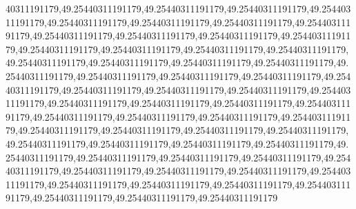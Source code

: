 40311191179,49.25440311191179,49.25440311191179,49.25440311191179,49.25440311191179,49.25440311191179,49.25440311191179,49.25440311191179,49.25440311191179,49.25440311191179,49.25440311191179,49.25440311191179,49.25440311191179,49.25440311191179,49.25440311191179,49.25440311191179,49.25440311191179,49.25440311191179,49.25440311191179,49.25440311191179,49.25440311191179,49.25440311191179,49.25440311191179,49.25440311191179,49.25440311191179,49.25440311191179,49.25440311191179,49.25440311191179,49.25440311191179,49.25440311191179,49.25440311191179,49.25440311191179,49.25440311191179,49.25440311191179,49.25440311191179,49.25440311191179,49.25440311191179,49.25440311191179,49.25440311191179,49.25440311191179,49.25440311191179,49.25440311191179,49.25440311191179,49.25440311191179,49.25440311191179,49.25440311191179,49.25440311191179,49.25440311191179,49.25440311191179,49.25440311191179,49.25440311191179,49.25440311191179,49.25440311191179,49.25440311191179,49.25440311191179,49.25440311191179,49.25440311191179,49.25440311191179,49.25440311191179,49.25440311191179,49.25440311191179,49.25440311191179
